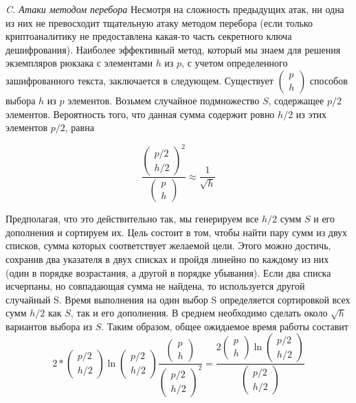 \documentclass[a4paper,12pt]{article}
\begin{document}
\textsl{C. Атаки методом перебора} \newline
\indent 
Несмотря на сложность предыдущих атак, ни одна из них не превосходит тщательную атаку методом перебора (если только криптоаналитику не предоставлена какая-то часть секретного ключа дешифрования). Наиболее эффективный метод, который мы знаем для решения экземпляров рюкзака с элементами $h$ из $p$, с учетом определенного зашифрованного текста, заключается в следующем. Существует $\begin{pmatrix}p\\h\end{pmatrix}$ способов выбора $h$ из $p$ элементов. Возьмем случайное подмножество $S$, содержащее $p/2$ элементов. Вероятность того, что данная сумма содержит ровно $h /2$ из этих элементов $p /2$, равна 

$$ \frac{\begin{pmatrix}p/2\\h/2\end{pmatrix}^2}{\begin{pmatrix}p\\h\end{pmatrix}} \approx \frac{1}{\sqrt{h}} $$

Предполагая, что это действительно так, мы генерируем все $h/2$ сумм $S$ и его дополнения и сортируем их. Цель состоит в том, чтобы найти пару сумм из двух списков, сумма которых соответствует желаемой цели. Этого можно достичь, сохранив два указателя в двух списках и пройдя линейно по каждому из них (один в порядке возрастания, а другой в порядке убывания). Если два списка исчерпаны, но совпадающая сумма не найдена, то используется другой случайный S. Время выполнения на один выбор S определяется сортировкой всех сумм $h/2$ как $S$, так и его дополнения. В среднем необходимо сделать около $\sqrt{h}$ вариантов выбора из $S$. Таким образом, общее ожидаемое время работы составит
$$ 2 * \begin{pmatrix}p/2\\h/2\end{pmatrix} \ln \begin{pmatrix}p/2\\h/2\end{pmatrix} \frac{\begin{pmatrix}p\\h\end{pmatrix}}{\begin{pmatrix}p/2\\h/2\end{pmatrix}^2} = \frac{2\begin{pmatrix}p\\h\end{pmatrix} \ln \begin{pmatrix}p/2\\h/2\end{pmatrix}}{\begin{pmatrix}p/2\\h/2\end{pmatrix}} $$
\end{document}
